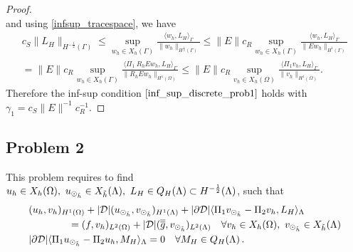 \begin{proof}
\begin{equation*}
\end{equation*}
and using \eqref{infsup_tracespace}, we have
\begin{multline}
c_S \|L_H\|_{H^{-\frac 12}(\Gamma)} 
\leq 
\sup_{w_h \in X_h(\Gamma)} \frac{ \langle w_h, L_H \rangle_{\Gamma} } {\|w_h\|_{H^{\frac 12}(\Gamma)}} 
\leq
\|E\| c_R \sup_{w_h \in X_h(\Gamma)} \frac{ \langle w_h, L_H \rangle_{\Gamma} } {\|E w_h\|_{H^1(\Gamma)}}
\\
=
\|E\| c_R \sup_{w_h \in X_h(\Gamma)} \frac{ \langle \Pi_1 \ R_h E w_h, L_H \rangle_{\Gamma} } {\|R_h E w_h\|_{H^1(\Omega)}} 
\leq \|E\| c_R \sup_{v_h \in X_h(\Omega)} \frac{ \langle \Pi_1 v_h, L_H \rangle_{\Gamma} } {\|v_h\|_{H^1(\Omega)}}. 
\end{multline}
Therefore the inf-sup condition $\eqref{inf_sup_discrete_prob1}$ holds with $\gamma_1 = c_S\|E\|^{-1} c_R^{-1}$.
\end{proof}


\subsection{Problem 2}
This problem requires to find  $u_h \in X_h(\Omega) ,\ u_{\odot_{\tilde{h}}} \in X_{\tilde{h}}(\Lambda), \ L_H \in Q_H(\Lambda) \subset H^{-\frac12}(\Lambda)$, such that
\begin{subequations}
\begin{align*}
&(u_h,v_h)_{H^1(\Omega)} + |{\cal D}|(\udh,\vdh)_{H^1(\Lambda)} 
+ |\partial {\cal D}| \langle  \Pi_1 \vdh - \Pi_2 v_h, L_H \rangle_\Lambda 
\\
\nonumber
&\qquad\qquad= (f,v_h)_{L^2(\Omega)} + |{\cal D}| (\avrd{g},\vdh)_{L^2(\Lambda)}
\quad \forall v_h \in X_h(\Omega), \ \vdh \in X_{\tilde{h}}(\Lambda)
\\
&  |\partial {\cal D}| \langle \Pi_1 \udh - \Pi_2 u_h, M_H \rangle_\Lambda = 0
\quad \forall M_H \in Q_H(\Lambda)\,.
\end{align*}
\end{subequations}

